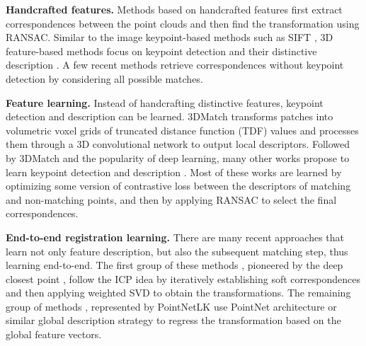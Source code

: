 \documentclass{bmvc2k}
\begin{document}
\textbf{Handcrafted features.} Methods based on handcrafted features first extract correspondences between the point clouds and then find the transformation using RANSAC. Similar to the image keypoint-based methods such as SIFT \cite{sift}, 3D feature-based methods focus on keypoint detection \cite{a-concise-and-provably-informative-heat-diffusion, harris-3d, learning-a-descriptor-specific-keypoint-detector} and their distinctive description \cite{narf-3d-range-features, fast-point-feature-histograms, unique-shape-context-for-3d-data-description, intrinsic-shape-signatures, using-spin-images-for-object-recognition, recognizing-objects-in-range-data, unique-signatures-of-shistograms, 3d-free-form-object-recognition, keypoint-based-4-pcs}. A few recent methods \cite{cofinet-reliable-coarse-to-fine-correspondences, geometric-transformer-for-fast-registration} retrieve correspondences without keypoint detection by considering all possible matches.

\textbf{Feature learning.} Instead of handcrafting distinctive features, keypoint detection and description can be learned. 3DMatch \cite{3dmatch} transforms patches into volumetric voxel grids of truncated distance function (TDF) values
and processes them through a 3D convolutional network \cite{c3d-3d-convolutional-networks, 3d-convolutional-network-for-human-action} to output local descriptors. Followed by 3DMatch and the popularity of deep learning, many other works propose to learn keypoint detection \cite{d3feat-joint-learning-of-dense-features, usip-unsupervised-stable-interest-point-detection, 3dfeat-net-weakly-supervised} and description \cite{fully-convolutional-geometric-features, ppfnet-global-context-local-features, learning-compact-geometric-features, predator}. Most of these works are learned by optimizing some version of contrastive loss \cite{contrastive-loss1, contrastive-loss2} between the descriptors of matching and non-matching points, and then by applying RANSAC to select the final correspondences.

\textbf{End-to-end registration learning.} There are many recent approaches that learn not only feature description, but also the subsequent matching step, thus learning end-to-end. The first group of these methods \cite{robust-point-cloud-registration-deep-graph-matching, prnet-self-supervised--for-partial-to-partial-registration, dcp-learning-representation-for-registration, rpm-net-robust-matching-using-learned-features, sticky-pillars, iterative-distance-aware-similarity-matrix, pcam-product-of-cross-attention-matrices, deep-gmr}, pioneered by the deep closest point \cite{dcp-learning-representation-for-registration}, follow the ICP idea by iteratively establishing soft correspondences and then applying weighted SVD to obtain the transformations. The remaining group of methods \cite{pointnetlk-robust-and-efficient-registration-using-pointnet, pointnetlk-revisited, feature-metric-registration-without-correspondences, omnet-learning-overlapping-mask, pcrnet}, represented by PointNetLK \cite{pointnetlk-robust-and-efficient-registration-using-pointnet} use PointNet architecture \cite{pointnet} or similar global description strategy to regress the transformation based on the global feature vectors.
\end{document}
